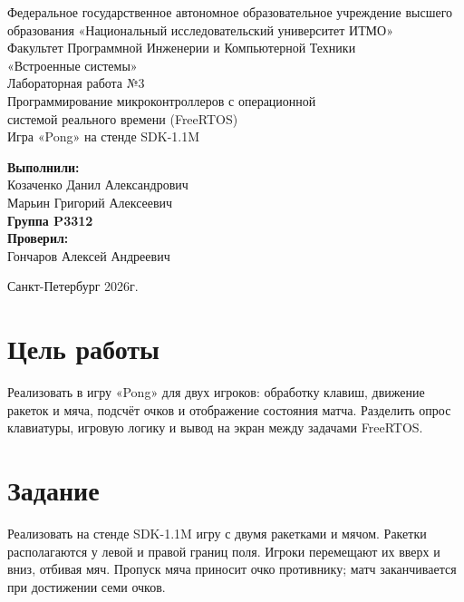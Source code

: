\documentclass[a4paper,12pt]{article}
\newcommand{\code}[1]{\texttt{\detokenize{#1}}}
\begin{document}
\begin{titlepage}
    \centering
    Федеральное государственное автономное образовательное учреждение высшего образования «Национальный исследовательский университет ИТМО» \\
    \vspace{1cm}
    Факультет Программной Инженерии и Компьютерной Техники \\
    \vfill
    {\large «Встроенные системы»} \\
    \vspace{0.5cm}
    Лабораторная работа №3 \\
    Программирование микроконтроллеров с операционной \\
    системой реального времени (FreeRTOS) \\
    Игра «Pong» на стенде SDK-1.1M
    \vfill
    \vspace{\fill}
    \begin{flushright}
        \textbf{Выполнили:} \\
        Козаченко Данил Александрович \\
        Марьин Григорий Алексеевич \\
        \textbf{Группа P3312} \\
        \textbf{Проверил:} \\
        Гончаров Алексей Андреевич
    \end{flushright}
    \vspace{2cm}
    Санкт-Петербург
    2026г.
\end{titlepage}

\setcounter{page}{1}
\begin{centering}
    \renewcommand{\contentsname}{Содержание}
    \tableofcontents
\end{centering}
\newpage

\section{Цель работы}
Реализовать в \code{main.c} игру «Pong» для двух игроков: обработку
клавиш, движение ракеток и мяча, подсчёт очков и отображение состояния
матча. Разделить опрос клавиатуры, игровую логику и вывод на экран
между задачами FreeRTOS.

\section{Задание}
Реализовать на стенде SDK-1.1M игру с двумя ракетками и мячом.
Ракетки располагаются у левой и правой границ поля. Игроки перемещают их
вверх и вниз, отбивая мяч. Пропуск мяча приносит очко противнику;
матч заканчивается при достижении семи очков.
\end{document}
